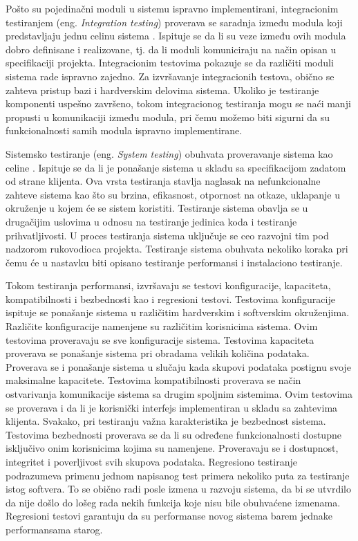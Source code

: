 \documentclass[12pt,oneside]{memoir}
\begin{document}
Pošto su pojedinačni moduli u sistemu ispravno implementirani, integracionim testiranjem (eng. \textit{Integration testing}) proverava se saradnja između modula koji predstavljaju jednu celinu sistema \cite{IntegrationTesting}. Ispituje se da li su veze između ovih modula dobro definisane i realizovane, tj. da li moduli komuniciraju na način opisan u specifikaciji projekta. 
Integracionim testovima pokazuje se da različiti moduli sistema rade ispravno zajedno. Za izvršavanje integracionih testova, obično se zahteva pristup bazi i hardverskim delovima sistema. Ukoliko je testiranje komponenti uspešno završeno, tokom integracionog testiranja mogu se naći manji propusti u komunikaciji između modula, pri čemu možemo biti sigurni da su funkcionalnosti samih modula ispravno implementirane.
\par
 
Sistemsko testiranje (eng. \textit{System testing}) obuhvata proveravanje sistema kao celine \cite{SystemTesting}. Ispituje se da li je ponašanje sistema u skladu sa specifikacijom zadatom od strane klijenta.
Ova vrsta testiranja stavlja naglasak na nefunkcionalne zahteve sistema kao što su brzina, efikasnost, otpornost na otkaze, uklapanje u okruženje u kojem će se sistem koristiti. 
Testiranje sistema obavlja se u drugačijim uslovima u odnosu na testiranje jedinica koda i testiranje prihvatljivosti. 
U proces testiranja sistema uključuje se ceo razvojni tim pod nadzorom rukovodioca projekta.
Testiranje sistema obuhvata nekoliko koraka pri čemu će u nastavku biti opisano testiranje performansi i instalaciono testiranje. 
\par
Tokom testiranja performansi, izvršavaju se testovi konfiguracije, kapaciteta, kompatibilnosti i bezbednosti kao i regresioni testovi. Testovima konfiguracije ispituje se ponašanje sistema u različitim hardverskim i softverskim okruženjima. 
Različite konfiguracije namenjene su različitim korisnicima sistema.
Ovim testovima proveravaju se sve konfiguracije sistema.
Testovima kapaciteta proverava se ponašanje sistema pri obradama velikih količina podataka. 
Proverava se i ponašanje sistema u slučaju kada skupovi podataka postignu svoje maksimalne kapacitete. 
Testovima kompatibilnosti proverava se način ostvarivanja komunikacije sistema sa drugim spoljnim sistemima.
Ovim testovima se proverava i da li je korisnički interfejs implementiran u skladu sa zahtevima klijenta. 
Svakako, pri testiranju važna karakteristika je bezbednost sistema.
Testovima bezbednosti proverava se da li su određene funkcionalnosti dostupne isključivo onim korisnicima kojima su namenjene. Proveravaju se i dostupnost, integritet i poverljivost svih skupova podataka. 
Regresiono testiranje podrazumeva primenu jednom napisanog test primera nekoliko puta za testiranje istog softvera. 
To se obično radi posle izmena u razvoju sistema, da bi se utvrdilo da nije došlo do lošeg rada nekih funkcija koje nisu bile obuhvaćene izmenama. 
Regresioni testovi garantuju da su performanse novog sistema barem jednake performansama starog. 
\end{document}
